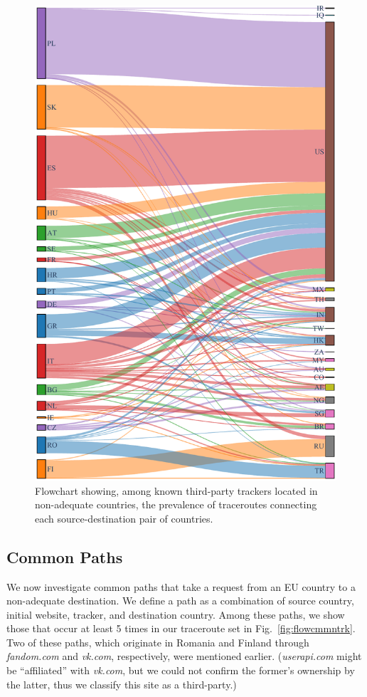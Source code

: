 \begin{figure}
    \centering
    \includegraphics[width=\linewidth]{figures/src-dst-no-first-party.pdf}
    \caption{Flowchart showing, among 
known third-party trackers located in non-adequate countries, 
the prevalence of traceroutes connecting each source-destination pair of countries.}
\label{fig:flowsrcdst}
\end{figure}


\subsection{Common Paths}

We now investigate common paths that take a request from an EU country
to a non-adequate destination. We define a path as a combination of 
source country, initial website, tracker, and destination country. 
Among these paths, we show those that occur at least 5 times in our traceroute
set in Fig.~\ref{fig:flowcmmntrk}. Two of these paths, which originate in 
Romania and Finland through \textit{fandom.com} and \textit{vk.com}, respectively, were mentioned earlier.
(\textit{userapi.com} might be ``affiliated'' with \textit{vk.com}, but we could not
confirm the former's ownership by the latter, thus we classify this site as a third-party.)

